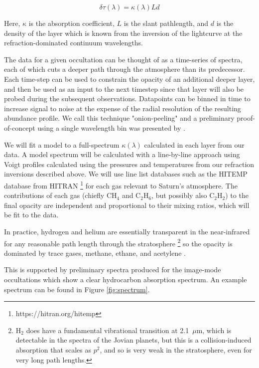 \documentclass[12pt]{article}
\begin{document}
\begin{equation}
\delta\tau(\lambda) = \kappa(\lambda) L d
\label{eq:optical_depth}
\end{equation}

\noindent Here, $\kappa$ is the absorption coefficient, $L$ is the slant
pathlength, and $d$ is the density of the layer which is known from the
inversion of the lightcurve at the refraction-dominated continuum wavelengths.

The data for a given occultation can be thought of as a time-series of spectra,
each of which cuts a deeper path through the atmosphere than its predecessor.
Each time-step can be used to constrain the opacity of an additional deeper
layer, and then be used as an input to the next timestep since that layer will
also be probed during the subsequent observations. Datapoints can be binned in
time to increase signal to noise at the expense of the radial resolution of the
resulting abundance profile. We call this technique "onion-peeling" and a
preliminary proof-of-concept using a single wavelength bin was presented by
\cite{Banfield11}.

We will fit a model to a full-spectrum $\kappa(\lambda)$ calculated in each
layer from our data. A model spectrum will be calculated with a line-by-line
approach using Voigt profiles calculated using the pressures and temperatures
from our refraction inversions described above.  We will use line list
databases such as the HITEMP database from HITRAN
\footnote{https://hitran.org/hitemp} \citep{Gordon17b} for each gas relevant to
Saturn's atmosphere. The contributions of each gas (chiefly CH$_4$ and
C$_2$H$_6$, but possibly also C$_2$H$_2$) to the final opacity are independent
and proportional to their mixing ratios, which will be fit to the data.

In practice, hydrogen and helium are essentially transparent in the
near-infrared for any reasonable path length through the stratosphere
\footnote{H$_2$ does have a fundamental vibrational transition at 2.1~$\mu$m,
which is detectable in the spectra of the Jovian planets, but this is a
collision-induced absorption that scales as  $p^2$, and so is very weak in the
stratosphere, even for very long path lengths.}  so the opacity is dominated by
trace gases, methane, ethane, and acetylene \citep{Moses05}.

This is supported by preliminary spectra produced for the image-mode
occultations which show a clear hydrocarbon absorption spectrum. An example
spectrum can be found in Figure \ref{fig:spectrum}. 
\end{document}
